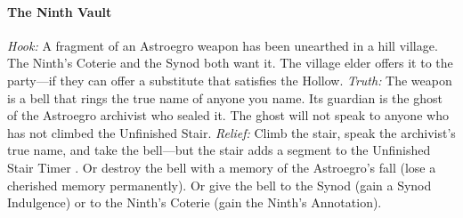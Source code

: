 \paragraph{The Ninth Vault}
\emph{Hook:} A fragment of an Astroegro weapon has been unearthed in a hill village. The Ninth's Coterie and the Synod both want it. The village elder offers it to the party---if they can offer a substitute that satisfies the Hollow.  
\emph{Truth:} The weapon is a bell that rings the true name of anyone you name. Its guardian is the ghost of the Astroegro archivist who sealed it. The ghost will not speak to anyone who has not climbed the Unfinished Stair.  
\emph{Relief:} Climb the stair, speak the archivist's true name, and take the bell---but the stair adds a segment to the Unfinished Stair Timer . Or destroy the bell with a memory of the Astroegro's fall (lose a cherished memory permanently). Or give the bell to the Synod (gain a Synod Indulgence) or to the Ninth's Coterie (gain the Ninth's Annotation).

